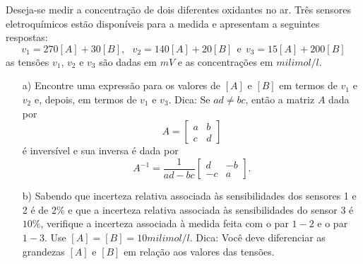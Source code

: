 \begin{exer} Deseja-se medir a concentração de dois diferentes oxidantes no ar. Três sensores eletroquímicos estão disponíveis para a medida e apresentam a seguintes respostas:
$$v_1= 270 [A] +  30 [B],~~~ v_2= 140 [A] +  20 [B] ~~ \text{e}~~ v_3= 15 [A] +  200 [B]$$
as tensões $v_1$, $v_2$ e $v_3$ são dadas em $mV$ e as concentrações em $milimol/l$.
\begin{itemize}
\item [a)] Encontre uma expressão para os valores de $[A]$ e $[B]$ em termos de $v_1$ e $v_2$ e, depois, em termos de $v_1$ e $v_3$. Dica:
Se $ad\neq bc$, então a matriz $A$ dada por
$$A=\begin{bmatrix}a&b\\c&d\end{bmatrix}$$
é inversível e sua inversa é dada por
$$A^{-1}= \frac{1}{ad-bc} \left[\begin{array}{cc}d&-b\\-c&a\end{array}\right].$$

\item[b)] Sabendo que incerteza relativa associada às sensibilidades dos sensores 1 e 2 é de $2\%$ e que a incerteza relativa associada às sensibilidades do sensor 3 é $10\%$, verifique a incerteza associada à medida feita com o par $1-2$ e o par $1-3$. Use $[A]=[B]=10milimol/l$. Dica: Você deve diferenciar as grandezas $[A]$ e $[B]$ em relação aos valores das tensões.
\end{itemize}
\end{exer}
